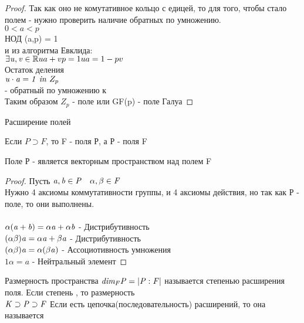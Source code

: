 \begin{proof}
  Так как оно не комутативное кольцо с едицей, то для того, чтобы стало полем -
  нужно проверить наличие обратных по умножению. \\
  $0<a<p$ \\
  НОД (a,p) = 1 \\
  и из алгоритма Евклида: \\
  $
  \exists \mathit {u,v} \in \mathbb {R} \\
  ua + vp = 1 \\
  ua = 1 - pv
  $ \\
  Остаток деления  \\
  $\mathit {u \cdot a = 1 ~in~} Z_{p}$ \\
   - обратный по умножению к  \\
  Таким образом $Z_p$ - поле или GF(p) - поле Галуа
\end{proof}

\begin{title}
  Расширение полей
\end{title}

Если $P \supset F$, то F -  поля Р, а Р -  поля F\\

\begin{defin}
  Поле Р - является векторным пространством над полем F
\end{defin}

\begin{proof}
  Пусть $\mathit{a,b \in P \quad \alpha,\beta\in F}$ \\
  Нужно 4 аксиомы коммутативности группы, и 4 аксиомы действия, но так как Р -
  поле, то они выполнены. \\
   \\
  $\mathit{\alpha(a+b)=\alpha a + \alpha b}$ - Дистрибутивность \\
  $\mathit{(\alpha \beta)a=\alpha a + \beta a}$ - Дистрибутивность \\
  $\mathit{(\alpha \beta)a=\alpha(\beta a)}$ - Ассоциотивность умножения \\
  $1\alpha=a$ - Нейтральный элемент
\end{proof}

\begin{defin}
  Размерность пространства $\mathit{dim_{F}P = |P:F|}$ называется степенью
  расширения поля. Если степень , то размерность
   \\
  $\mathit {K \supset P \supset F}$ Если есть цепочка(последовательность)
  расширений, то она называется 
\end{defin}


